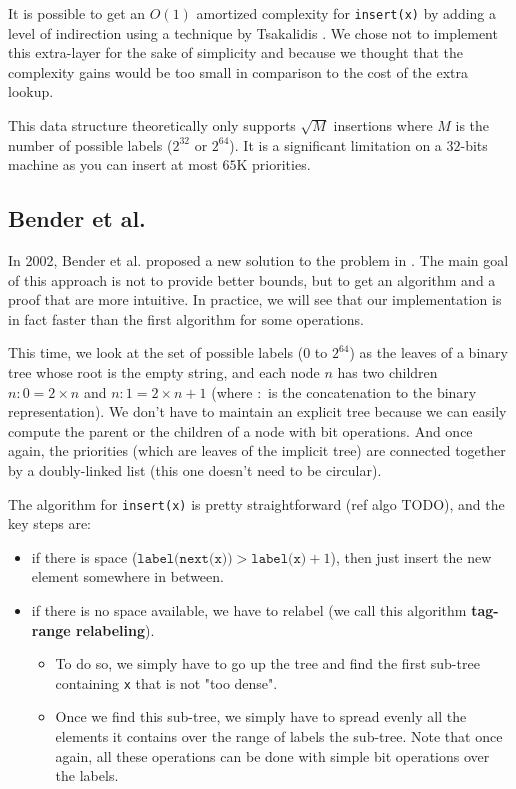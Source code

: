\documentclass[12pt]{article}
\begin{document}
It is possible to get an $O(1)$ amortized complexity for \texttt{insert(x)} by adding a level of indirection using a technique by Tsakalidis \cite{10.1007/BFb0036494}. We chose not to implement this extra-layer for the sake of simplicity and because we thought that the complexity gains would be too small in comparison to the cost of the extra lookup.

This data structure theoretically only supports $\sqrt{M}$ insertions where $M$ is the number of possible labels ($2^32$ or $2^{64}$). It is a significant limitation on a $32$-bits machine as you can insert at most $65$K priorities.

\subsection{Bender et al.}

In 2002, Bender et al. proposed a new solution to the problem in \cite{10.5555/647912.740822}. The main goal of this approach is not to provide better bounds, but to get an algorithm and a proof that are more intuitive. In practice, we will see that our implementation is in fact faster than the first algorithm for some operations.

This time, we look at the set of possible labels ($0$ to $2^{64}$) as the leaves of a binary tree whose root is the empty string, and each node $n$ has two children $n:0 = 2 \times n$ and $n:1 = 2 \times n + 1$ (where $:$ is the concatenation to the binary representation).
We don't have to maintain an explicit tree because we can easily compute the parent or the children of a node with bit operations.
And once again, the priorities (which are leaves of the implicit tree) are connected together by a doubly-linked list (this one doesn't need to be circular).

The algorithm for \texttt{insert(x)} is pretty straightforward (ref algo TODO), and the key steps are:

\begin{itemize}
  \item if there is space ($\texttt{label(next(x))} > \texttt{label(x)} + 1$), then just insert the new element somewhere in between.
  \item if there is no space available, we have to relabel (we call this algorithm \textbf{tag-range relabeling}).
        \begin{itemize}
          \item To do so, we simply have to go up the tree and find the first sub-tree containing \texttt{x} that is not "too dense".
          \item Once we find this sub-tree, we simply have to spread evenly all the elements it contains over the range of labels the sub-tree. Note that once again, all these operations can be done with simple bit operations over the labels.
        \end{itemize}
\end{itemize}
\end{document}
